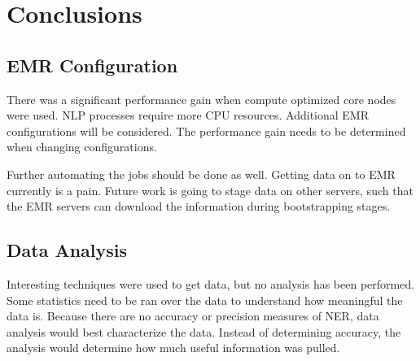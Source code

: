 \documentclass[12pt,a4paper]{article}
\begin{document}
\section{Conclusions}

\subsection{EMR Configuration}

There was a significant performance gain when compute optimized core
nodes were used. NLP processes require more CPU resources. Additional
EMR configurations will be considered. The performance gain
needs to be determined when changing configurations.

Further automating the jobs should be done as well. Getting data
on to EMR currently is a pain. Future work is going to stage
data on other servers, such that the EMR servers can download
the information during bootstrapping stages. 

\subsection{Data Analysis}

Interesting techniques were used to get data, but no analysis
has been performed. Some statistics need to be ran over the
data to understand how meaningful the data is. Because there are no
accuracy or precision measures of NER, data analysis would
best characterize the data. Instead of determining accuracy,
the analysis would determine how much useful information
was pulled.




% 
% 
\end{document}
